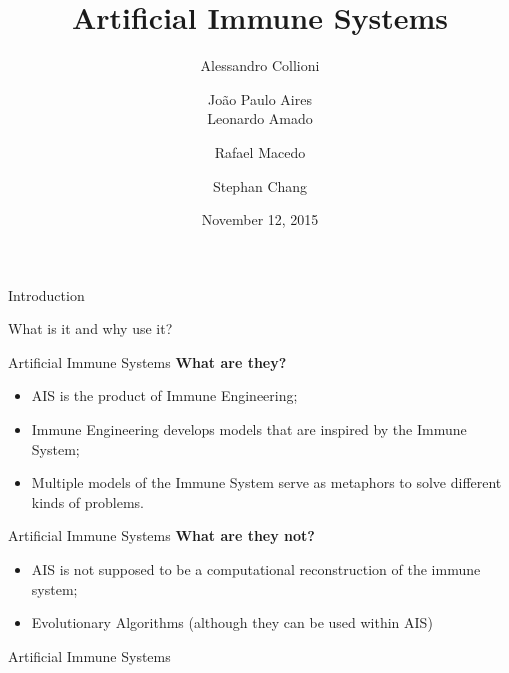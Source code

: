 \documentclass[xcolor=svgnames]{beamer}
\title{Artificial Immune Systems}
\author[Aires, Amado, Chang, Collioni, Macedo]
    {
        Alessandro Collioni\and
        João Paulo Aires\\ \vspace{0.25em}
        Leonardo Amado\and
        Rafael Macedo\and
        Stephan Chang
    }
\date{November 12, 2015}
\institute
    {
        Pontifical Catholic University of Rio Grande do Sul, PUCRS\\
        Porto Alegre -- Brazil
    }
\newcommand{\introframe}[2]{
    \begin{frame}
	   \vfill
	   \hfill\Huge{#1}
	   
	   \vspace{1em}
	   
	   \hfill\Large{#2}
	   \vfill
    \end{frame}
}
\begin{document}
    \maketitle

	\introframe{Introduction}{What is it and why use it?}
	
	\begin{frame}{Artificial Immune Systems}
            \textbf{What are they?}
        
            \begin{itemize}
                \item AIS is the product of Immune Engineering;
				\item Immune Engineering develops models that are inspired by the Immune System;
                \item Multiple models of the Immune System serve as  metaphors to solve different kinds of problems.
            \end{itemize}
            
        \end{frame}
        \begin{frame}{Artificial Immune Systems}            
            \textbf{What are they not?}
            
            \begin{itemize}
                \item AIS is not supposed to be a computational reconstruction of the immune system;
                \item Evolutionary Algorithms (although they can be used within AIS)
            \end{itemize}    
    	\end{frame}
    	
        \begin{frame}{Artificial Immune Systems}
        	\begin{itemize}
         	\end{itemize}
    	\end{frame}
	
\end{document}
